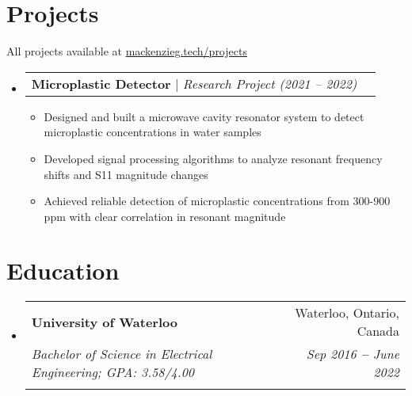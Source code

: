 \documentclass[letterpaper,11pt]{article}
\makeatletter
\newcommand{\resumeItem}[1]{
  \item\small{
    {#1 \vspace{-2pt}}
  }
}
\newcommand{\resumeEducationHeading}[6]{
  \vspace{-2pt}\item
    \begin{tabular*}{0.97\textwidth}[t]{l@{\extracolsep{\fill}}r}
      \textbf{#1} & #2 \\
      \textit{\small#3} & \textit{\small #4} \\
      \textit{\small#5} & \textit{\small #6} \\
    \end{tabular*}\vspace{-5pt}
}
\newcommand{\resumeProjectHeading}[2]{
    \vspace{-2pt}\item
    \begin{tabular*}{0.97\textwidth}{l@{\extracolsep{\fill}}r}
      \small#1 & #2 \\
    \end{tabular*}\vspace{-7pt}
}
\newcommand{\resumeSubHeadingListStart}{\begin{itemize}[leftmargin=0.15in, label={}]}
\newcommand{\resumeSubHeadingListEnd}{\end{itemize}}
\newcommand{\resumeItemListStart}{\begin{itemize}}
\newcommand{\resumeItemListEnd}{\end{itemize}\vspace{-5pt}}
\makeatother
\begin{document}

\section{Projects}
\vspace{3pt}
\small{All projects available at \href{https://mackenzieg.tech/projects}{mackenzieg.tech/projects}}
\vspace{3pt}
\resumeSubHeadingListStart

  \resumeProjectHeading
    {\textbf{Microplastic Detector} $|$ \emph{Research Project (2021 -- 2022)}}{}
      \resumeItemListStart
        \resumeItem{Designed and built a microwave cavity resonator system to detect microplastic concentrations in water samples}
        \resumeItem{Developed signal processing algorithms to analyze resonant frequency shifts and S11 magnitude changes}
        \resumeItem{Achieved reliable detection of microplastic concentrations from 300-900 ppm with clear correlation in resonant magnitude}
      \resumeItemListEnd

\resumeSubHeadingListEnd



\section{Education}
  \vspace{3pt}
  \resumeSubHeadingListStart
    
    \resumeEducationHeading
      {University of Waterloo
      }{Waterloo, Ontario, Canada}
      {Bachelor of Science in Electrical Engineering; GPA: 3.58/4.00}{Sep 2016 \textbf{--} June 2022}
      {}{}

  \resumeSubHeadingListEnd




        
\end{document}
